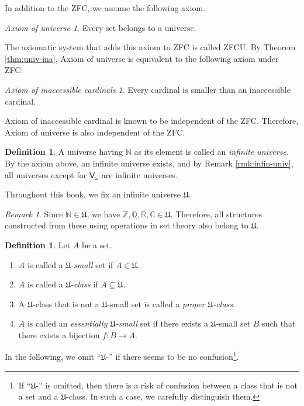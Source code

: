 \documentclass{surv-l}
\numberwithin{equation}{chapter}
\numberwithin{figure}{chapter}
\theoremstyle{plain}
\theoremstyle{definition}
\newtheorem{dfn}[thm]{Definition}
\theoremstyle{remark}
\newtheorem{rmk}[thm]{Remark}
\begin{document}
In addition to the ZFC, we assume the following axiom.

\newtheorem*{univ-axiom}{Axiom of universe}
\begin{univ-axiom}
Every set belongs to a universe.
\end{univ-axiom}

The axiomatic system that adds this axiom to ZFC is called ZFCU.
By Theorem \ref{thm:univ-ina},
Axiom of universe is equivalent to the following axiom under ZFC:

\newtheorem*{inac-axiom}{Axiom of inaccessible cardinals}
\begin{inac-axiom}
Every cardinal is smaller than an inaccessible cardinal.
\end{inac-axiom}

Axiom of inaccessible cardinal is known to be independent of the ZFC.
Therefore, Axiom of universe is also independent of the ZFC.

\begin{dfn}
A universe having $\mathbb{N}$ as its element is called an \emph{infinite universe}.
By the axiom above, an infinite universe exists, and by Remark \ref{rmk:infin-univ},
all universes except for $\mathsf{V}_\omega$ are infinite universes.
\end{dfn}

Throughout this book, we fix an infinite universe $\mathfrak{U}$.

\begin{rmk}
Since $\mathbb{N} \in \mathfrak{U}$, we have $\mathbb{Z}, \mathbb{Q}, \mathbb{R}, \mathbb{C} \in \mathfrak{U}$.
Therefore, all structures constructed from these using operations in set theory also belong to
$\mathfrak{U}$.
\end{rmk}

\begin{dfn}\label{dfn:small-class}
Let $A$ be a set.
\begin{enumerate}
\item
$A$ is called a $\mathfrak{U}$-\emph{small} set if $A \in \mathfrak{U}$.
\item
$A$ is called a $\mathfrak{U}$-\emph{class} if $A \subseteq \mathfrak{U}$.
\item
A $\mathfrak{U}$-class that is not a $\mathfrak{U}$-small set is called a \emph{proper $\mathfrak{U}$-class}.
\item
$A$ is called an \emph{essentially $\mathfrak{U}$-small} set if
there exists a $\mathfrak{U}$-small set $B$ such that there exists a bijection $f\colon B \to A$.
\end{enumerate}
In the following, we omit ``$\mathfrak{U}$-'' if there seems to be no confusion\footnote{If ``$\mathfrak{U}$-'' is omitted, then there is a risk of confusion between
a class that is not a set and a $\mathfrak{U}$-class.  In such a case, we carefully distinguish them.}.
\end{dfn}
\end{document}
